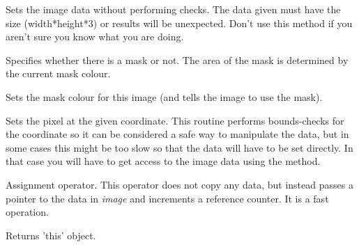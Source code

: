 

\label{wximagesetdata}


Sets the image data without performing checks. The data given must have
the size (width*height*3) or results will be unexpected. Don't use this
method if you aren't sure you know what you are doing.

\label{wximagesetmask}


Specifies whether there is a mask or not. The area of the mask is determined by the current mask colour.

\label{wximagesetmaskcolour}


Sets the mask colour for this image (and tells the image to use the mask).

\label{wximagesetrgb}


Sets the pixel at the given coordinate. This routine performs bounds-checks
for the coordinate so it can be considered a safe way to manipulate the
data, but in some cases this might be too slow so that the data will have to
be set directly. In that case you will have to get access to the image data 
using the  method.



Assignment operator. This operator does not copy any data, but instead
passes a pointer to the data in {\it image} and increments a reference
counter. It is a fast operation.




Returns 'this' object.

